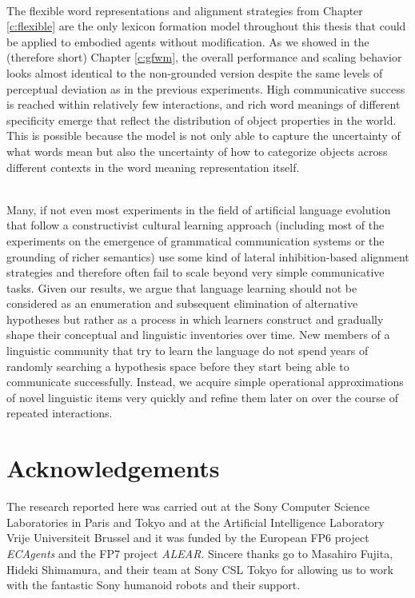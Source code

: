 ~\\

 The
flexible word representations and alignment strategies from Chapter
\ref{c:flexible} are the only lexicon formation model throughout this
thesis that could be applied to embodied agents without
modification. As we showed in the (therefore short) Chapter
\ref{c:gfwm}, the overall performance and scaling behavior looks
almost identical to the non-grounded version despite the same levels
of perceptual deviation as in the previous experiments. High
communicative success is reached within relatively few interactions,
and rich word meanings of different specificity emerge that reflect
the distribution of object properties in the world. This is possible
because the model is not only able to capture the uncertainty of what
words mean but also the uncertainty of how to categorize objects
across different contexts in the word meaning representation itself.


~\\

\noindent Many, if not even most experiments in the field of
artificial language evolution that follow a constructivist cultural
learning approach (including most of the experiments on the emergence
of grammatical communication systems or the grounding of richer
semantics) use some kind of lateral inhibition-based alignment
strategies and therefore often fail to scale beyond very simple
communicative tasks. Given our results, we argue that language
learning should not be considered as an enumeration and subsequent
elimination of alternative hypotheses but rather as a process in which
learners construct and gradually shape their conceptual and linguistic
inventories over time. New members of a linguistic community that try
to learn the language do not spend years of randomly searching a
hypothesis space before they start being able to communicate
successfully. Instead, we acquire simple operational approximations of
novel linguistic items very quickly and refine them later on over the
course of repeated interactions.




\section{Acknowledgements}

The research reported here was carried out at the Sony
Computer Science Laboratories in Paris and Tokyo and at the Artificial
Intelligence Laboratory Vrije Universiteit Brussel and it was funded
by the European FP6 project \emph{ECAgents} and the FP7 project
\emph{ALEAR}. Sincere thanks go to Masahiro Fujita, Hideki Shimamura,
and their team at Sony CSL Tokyo for allowing us to work with the
fantastic Sony humanoid robots and their support.

